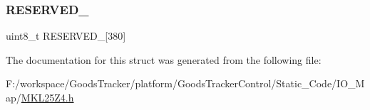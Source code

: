 \mbox{\label{struct_n_v_i_c___mem_map_a19f786736ec5a1004fb2811eacc76f13}} 
\subsubsection{\texorpdfstring{R\+E\+S\+E\+R\+V\+E\+D\+\_}{RESERVED\_3}}
{\footnotesize\ttfamily uint8\+\_\+t R\+E\+S\+E\+R\+V\+E\+D\+\_\mbox{[}380\mbox{]}}



The documentation for this struct was generated from the following file\+:\begin{DoxyCompactItemize}
\item 
F\+:/workspace/\+Goods\+Tracker/platform/\+Goods\+Tracker\+Control/\+Static\+\_\+\+Code/\+I\+O\+\_\+\+Map/\hyperlink{_m_k_l25_z4_8h}{M\+K\+L25\+Z4.\+h}\end{DoxyCompactItemize}
